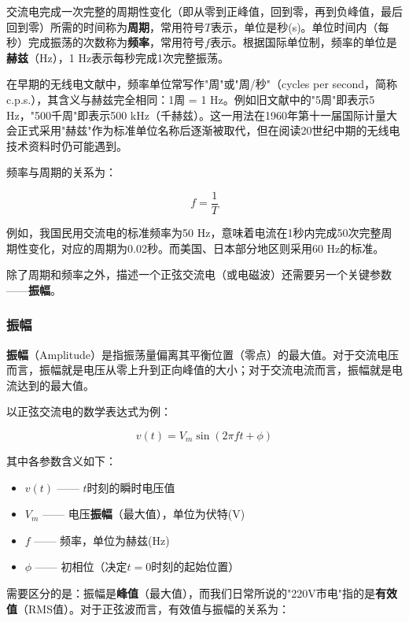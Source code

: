 \documentclass[12pt,UTF8]{ctexbook}
\begin{document}
交流电完成一次完整的周期性变化（即从零到正峰值，回到零，再到负峰值，最后回到零）所需的时间称为\textbf{周期}，常用符号$T$表示，单位是秒(s)。单位时间内（每秒）完成振荡的次数称为\textbf{频率}，常用符号$f$表示。根据国际单位制，频率的单位是\textbf{赫兹}（Hz），1 Hz表示每秒完成1次完整振荡。

在早期的无线电文献中，频率单位常写作"周"或"周/秒"（cycles per second，简称c.p.s.），其含义与赫兹完全相同：1周 = 1 Hz。例如旧文献中的"5周"即表示5 Hz，"500千周"即表示500 kHz（千赫兹）。这一用法在1960年第十一届国际计量大会正式采用"赫兹"作为标准单位名称后逐渐被取代，但在阅读20世纪中期的无线电技术资料时仍可能遇到。

频率与周期的关系为：

\begin{equation}
f = \frac{1}{T}
\end{equation}

例如，我国民用交流电的标准频率为50 Hz，意味着电流在1秒内完成50次完整周期性变化，对应的周期为0.02秒。而美国、日本部分地区则采用60 Hz的标准。

除了周期和频率之外，描述一个正弦交流电（或电磁波）还需要另一个关键参数——\textbf{振幅}。

\subsubsection{振幅}

\textbf{振幅}（Amplitude）是指振荡量偏离其平衡位置（零点）的最大值。对于交流电压而言，振幅就是电压从零上升到正向峰值的大小；对于交流电流而言，振幅就是电流达到的最大值。

以正弦交流电的数学表达式为例：

\begin{equation}
	v(t) = V_{m} \sin(2\pi f t + \phi)
\end{equation}

其中各参数含义如下：
\begin{itemize}
	\item $v(t)$ —— $t$时刻的瞬时电压值
	\item $V_{m}$ —— 电压\textbf{振幅}（最大值），单位为伏特(V)
	\item $f$ —— 频率，单位为赫兹(Hz)
	\item $\phi$ —— 初相位（决定$t=0$时刻的起始位置）
\end{itemize}

需要区分的是：振幅是\textbf{峰值}（最大值），而我们日常所说的"220V市电"指的是\textbf{有效值}（RMS值）。对于正弦波而言，有效值与振幅的关系为：
\end{document}
